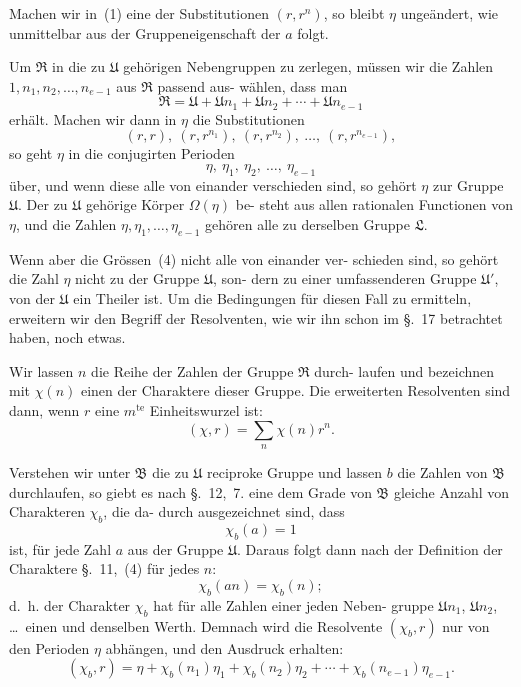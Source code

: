 \documentclass[12pt,a4paper]{article}
\theoremstyle{plain}
\theoremstyle{definition}
\theoremstyle{remark}
\begin{document}
Machen wir in~(1) eine der Substitutionen $(r, r^n)$, so bleibt
$\eta$ ungeändert, wie unmittelbar aus der Gruppeneigenschaft der
$a$ folgt.

Um $\mathfrak{R}$ in die zu $\mathfrak{U}$ gehörigen Nebengruppen zu zerlegen,
müssen wir die Zahlen $1, n_1, n_2, \ldots, n_{e-1}$ aus $\mathfrak{R}$ passend aus-
wählen, dass man
\begin{equation}\tag{2}
\mathfrak{R} = \mathfrak{U} + \mathfrak{U} n_1 + \mathfrak{U} n_2 + \cdots + \mathfrak{U} n_{e-1}
\end{equation}
erhält. Machen wir dann in $\eta$ die Substitutionen
\begin{equation}\tag{3}
(r, r), \ (r, r^{n_1}), \ (r, r^{n_2}), \ \ldots, \ (r, r^{n_{e-1}}),
\end{equation}
so geht $\eta$ in die conjugirten Perioden
\begin{equation}\tag{4}
\eta, \ \eta_1, \ \eta_2, \ \ldots, \ \eta_{e-1}
\end{equation}
über, und wenn diese alle von einander verschieden sind, so
gehört $\eta$ zur Gruppe $\mathfrak{U}$. Der zu $\mathfrak{U}$ gehörige Körper $\Omega(\eta)$ be-
steht aus allen rationalen Functionen von $\eta$, und die Zahlen
$\eta, \eta_1, \ldots, \eta_{e-1}$ gehören alle zu derselben Gruppe $\mathfrak{L}$.

Wenn aber die Grössen~(4) nicht alle von einander ver-
schieden sind, so gehört die Zahl $\eta$ nicht zu der Gruppe $\mathfrak{U}$, son-
dern zu einer umfassenderen Gruppe $\mathfrak{U}'$, von der $\mathfrak{U}$ ein Theiler
ist. Um die Bedingungen für diesen Fall zu ermitteln, erweitern
wir den Begriff der Resolventen, wie wir ihn schon im \S.~17
betrachtet haben, noch etwas.

Wir lassen $n$ die Reihe der Zahlen der Gruppe $\mathfrak{R}$ durch-
laufen und bezeichnen mit $\chi(n)$ einen der Charaktere dieser
Gruppe. Die erweiterten Resolventen sind dann, wenn $r$ eine
$m^{\text{te}}$ Einheitswurzel ist:
\begin{equation}\tag{5}
(\chi, r) = \sum_n \chi(n) r^n.
\end{equation}

Verstehen wir unter $\mathfrak{B}$ die zu $\mathfrak{U}$ reciproke Gruppe und lassen
$b$ die Zahlen von $\mathfrak{B}$ durchlaufen, so giebt es nach \S.~12,~7. eine
dem Grade von $\mathfrak{B}$ gleiche Anzahl von Charakteren $\chi_b$, die da-
durch ausgezeichnet sind, dass
\[
\chi_b(a) = 1
\]
ist, für jede Zahl $a$ aus der Gruppe $\mathfrak{U}$. Daraus folgt dann nach
der Definition der Charaktere \S.~11,~(4) für jedes $n$:
\begin{equation}\tag{6}
\chi_b(an) = \chi_b(n);
\end{equation}
d.~h. der Charakter $\chi_b$ hat für alle Zahlen einer jeden Neben-
gruppe $\mathfrak{U} n_1$, $\mathfrak{U} n_2$, \ldots\ einen und denselben Werth. Demnach wird
die Resolvente $(\chi_b, r)$ nur von den Perioden $\eta$ abhängen, und
den Ausdruck erhalten:
\begin{equation}\tag{7}
(\chi_b, r) = \eta + \chi_b(n_1) \eta_1 + \chi_b(n_2) \eta_2 + \cdots + \chi_b(n_{e-1}) \eta_{e-1}.
\end{equation}
\end{document}

